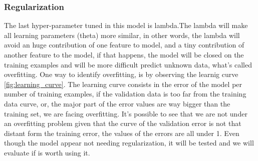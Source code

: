 \documentclass[12pt,a4paper,twocolumn]{article}
\begin{document}
\subsubsection{Regularization}
\par The last hyper-parameter tuned in this model is lambda.The lambda will make all learning parameters (theta) more similar, in other words, the lambda will avoid an huge contribution of one feature to model, and a tiny contribution of another feature to the model, if that happens, the model will be closed on the training examples and will be more difficult predict unknown data, what's called overfitting. One way to identify overfitting, is by observing the learnig curve \ref{fig:learning_curve}. The learning curve consists in the error of the model per number of training examples, if the validation data is too far from the training data curve, or, the major part of the error values are way bigger than the training set, we are facing overfitting. It's possible to see that we are not under an overfitting problem given that the curve of the validation error is not that distant form the training error, the values of the errors are all under 1. Even though  the model appear not needing regularization, it will be tested and we will evaluate if is worth using it.
\end{document}
